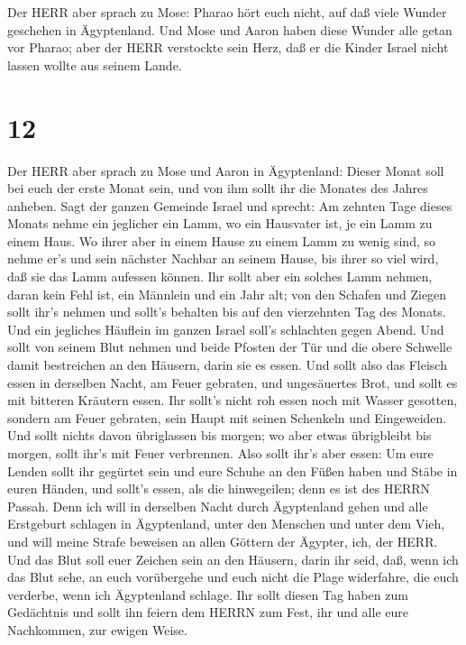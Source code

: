  Der HERR aber sprach zu Mose: Pharao hört euch nicht, auf
daß viele Wunder geschehen in Ägyptenland.  Und Mose und
Aaron haben diese Wunder alle getan vor Pharao; aber der HERR verstockte
sein Herz, daß er die Kinder Israel nicht lassen wollte aus seinem
Lande.

\hypertarget{section-11}{%
\section{12}\label{section-11}}

 Der HERR aber sprach zu Mose und Aaron in Ägyptenland:
 Dieser Monat soll bei euch der erste Monat sein, und von
ihm sollt ihr die Monates des Jahres anheben.  Sagt der
ganzen Gemeinde Israel und sprecht: Am zehnten Tage dieses Monats nehme
ein jeglicher ein Lamm, wo ein Hausvater ist, je ein Lamm zu einem Haus.
 Wo ihrer aber in einem Hause zu einem Lamm zu wenig sind,
so nehme er's und sein nächster Nachbar an seinem Hause, bis ihrer so
viel wird, daß sie das Lamm aufessen können.  Ihr sollt aber
ein solches Lamm nehmen, daran kein Fehl ist, ein Männlein und ein Jahr
alt; von den Schafen und Ziegen sollt ihr's nehmen  und
sollt's behalten bis auf den vierzehnten Tag des Monats. Und ein
jegliches Häuflein im ganzen Israel soll's schlachten gegen Abend.
 Und sollt von seinem Blut nehmen und beide Pfosten der Tür
und die obere Schwelle damit bestreichen an den Häusern, darin sie es
essen.  Und sollt also das Fleisch essen in derselben Nacht,
am Feuer gebraten, und ungesäuertes Brot, und sollt es mit bitteren
Kräutern essen.  Ihr sollt's nicht roh essen noch mit Wasser
gesotten, sondern am Feuer gebraten, sein Haupt mit seinen Schenkeln und
Eingeweiden.  Und sollt nichts davon übriglassen bis
morgen; wo aber etwas übrigbleibt bis morgen, sollt ihr's mit Feuer
verbrennen.  Also sollt ihr's aber essen: Um eure Lenden
sollt ihr gegürtet sein und eure Schuhe an den Füßen haben und Stäbe in
euren Händen, und sollt's essen, als die hinwegeilen; denn es ist des
HERRN Passah.  Denn ich will in derselben Nacht durch
Ägyptenland gehen und alle Erstgeburt schlagen in Ägyptenland, unter den
Menschen und unter dem Vieh, und will meine Strafe beweisen an allen
Göttern der Ägypter, ich, der HERR.  Und das Blut soll euer
Zeichen sein an den Häusern, darin ihr seid, daß, wenn ich das Blut
sehe, an euch vorübergehe und euch nicht die Plage widerfahre, die euch
verderbe, wenn ich Ägyptenland schlage.  Ihr sollt diesen
Tag haben zum Gedächtnis und sollt ihn feiern dem HERRN zum Fest, ihr
und alle eure Nachkommen, zur ewigen Weise.

